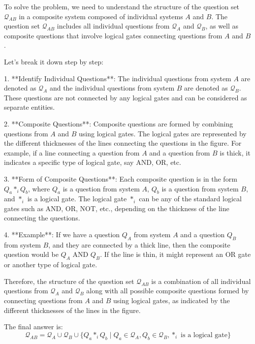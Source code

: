 To solve the problem, we need to understand the structure of the question set \(\mathcal{Q}_{AB}\) in a composite system composed of individual systems \(A\) and \(B\). The question set \(\mathcal{Q}_{AB}\) includes all individual questions from \(\mathcal{Q}_A\) and \(\mathcal{Q}_B\), as well as composite questions that involve logical gates connecting questions from \(A\) and \(B\).

Let's break it down step by step:

1. **Identify Individual Questions**: The individual questions from system \(A\) are denoted as \(\mathcal{Q}_A\) and the individual questions from system \(B\) are denoted as \(\mathcal{Q}_B\). These questions are not connected by any logical gates and can be considered as separate entities.

2. **Composite Questions**: Composite questions are formed by combining questions from \(A\) and \(B\) using logical gates. The logical gates are represented by the different thicknesses of the lines connecting the questions in the figure. For example, if a line connecting a question from \(A\) and a question from \(B\) is thick, it indicates a specific type of logical gate, say AND, OR, etc.

3. **Form of Composite Questions**: Each composite question is in the form \(Q_a *_i Q_b\), where \(Q_a\) is a question from system \(A\), \(Q_b\) is a question from system \(B\), and \(*_i\) is a logical gate. The logical gate \(*_i\) can be any of the standard logical gates such as AND, OR, NOT, etc., depending on the thickness of the line connecting the questions.

4. **Example**: If we have a question \(Q_A\) from system \(A\) and a question \(Q_B\) from system \(B\), and they are connected by a thick line, then the composite question would be \(Q_A \text{ AND } Q_B\). If the line is thin, it might represent an OR gate or another type of logical gate.

Therefore, the structure of the question set \(\mathcal{Q}_{AB}\) is a combination of all individual questions from \(\mathcal{Q}_A\) and \(\mathcal{Q}_B\) along with all possible composite questions formed by connecting questions from \(A\) and \(B\) using logical gates, as indicated by the different thicknesses of the lines in the figure.

The final answer is:
\[
\boxed{\mathcal{Q}_{AB} = \mathcal{Q}_A \cup \mathcal{Q}_B \cup \{Q_a *_i Q_b \mid Q_a \in \mathcal{Q}_A, Q_b \in \mathcal{Q}_B, *_i \text{ is a logical gate}\}}
\]